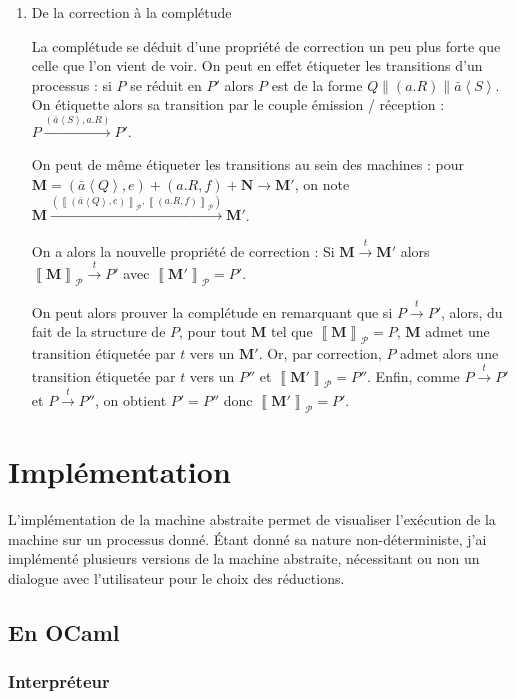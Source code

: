 \documentclass[11pt]{article}
\newcommand{\send}[2]{\bar{#1}\left\langle #2\right\rangle}
\newcommand{\paren}[1]{\left(#1\right)}
\newcommand{\process}[1]{\left\llbracket{#1}\right\rrbracket_{\mathcal{P}}}
\begin{document}
\begin{enumerate}
\textit{}

\item De la correction à la complétude
\label{sec-3-2-3-4}

La complétude se déduit d'une propriété de correction un peu plus forte que celle que l'on vient de voir.
On peut en effet étiqueter les transitions d'un processus : si $P$ se réduit en $P'$ alors $P$ est de la forme $Q\parallel(a.R)\parallel\send{a}S$.
On étiquette alors sa transition par le couple émission / réception :
$P\xrightarrow{(\send{a}S, a.R)} P'$.

On peut de même étiqueter les transitions au sein des machines : pour $\mathbf{M} = (\send{a}Q, e) + (a.R, f) + \mathbf{N} \to \mathbf{M}'$, on note
$\mathbf{M} \xrightarrow{\paren{ \process{(\send{a}Q, e)}, \process{(a.R,f)}} } \mathbf{M}'$.

On a alors la nouvelle propriété de correction :
Si $\mathbf{M}\xrightarrow{t} \mathbf{M}'$ alors $\process{\mathbf{M}}\xrightarrow{t} P'$ avec $\process{\mathbf{M}'} = P'$.

On peut alors prouver la complétude en remarquant que si $P\xrightarrow{t}P'$, alors, du fait de la structure de $P$, pour tout $\mathbf{M}$ tel que $\process{\mathbf{M}} = P$, $\mathbf{M}$ admet une transition étiquetée par $t$ vers un $\mathbf{M}'$.
Or, par correction, $P$ admet alors une transition étiquetée par $t$ vers un $P''$ et $\process{\mathbf{M}'} = P''$.
Enfin, comme $P\xrightarrow{t} P'$ et $P\xrightarrow{t} P''$, on obtient $P' = P''$ donc $\process{\mathbf{M}'} = P'$.

\end{enumerate}


\section{Implémentation}
\label{sec-4}

L'implémentation de la machine abstraite permet de visualiser l'exécution de la machine sur un processus donné.
\'Etant donné sa nature non-déterministe, j'ai implémenté plusieurs versions de la machine abstraite, nécessitant ou non un dialogue avec l'utilisateur pour le choix des réductions.

\subsection{En OCaml}
\label{sec-4-1}
\subsubsection{Interpréteur}
\label{sec-4-1-1}
\end{document}
